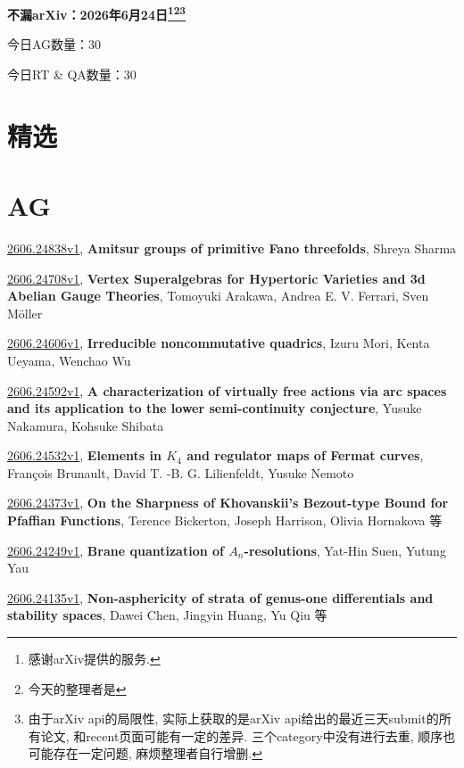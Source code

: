 \documentclass[9pt, a4paper]{article}
\theoremstyle{plain}
\theoremstyle{definition}
\theoremstyle{remark}
\newcommand{\arxiv}[3]{\href{https://arxiv.org/abs/#1}{#1}, \textbf{\textcolor{arxivblue}{#2}}, #3}
\newcommand{\AGnumber}{30}
\newcommand{\RTQAnumber}{30}
\newcommand{\NewestDate}{2026年6月24日}
\newcommand{\todayarXiver}{} %
\begin{document}
\begin{center}
    \Huge\textbf{不漏arXiv：\NewestDate\footnote{感谢arXiv提供的服务.}\footnote{今天的整理者是\todayarXiver}\footnote{由于arXiv api的局限性, 实际上获取的是arXiv api给出的最近三天submit的所有论文, 和recent页面可能有一定的差异. 三个category中没有进行去重, 顺序也可能存在一定问题, 麻烦整理者自行增删.}} \\
\end{center}

\setcounter{section}{-1}

\begin{center}
    今日AG数量：\AGnumber
    
    今日RT \& QA数量：\RTQAnumber
    
\end{center}


\section{精选}


\section{AG}
\arxiv{2606.24838v1}{Amitsur groups of primitive Fano threefolds}{Shreya Sharma}

\arxiv{2606.24708v1}{Vertex Superalgebras for Hypertoric Varieties and 3d Abelian Gauge Theories}{Tomoyuki Arakawa, Andrea E. V. Ferrari, Sven Möller}

\arxiv{2606.24606v1}{Irreducible noncommutative quadrics}{Izuru Mori, Kenta Ueyama, Wenchao Wu}

\arxiv{2606.24592v1}{A characterization of virtually free actions via arc spaces and its application to the lower semi-continuity conjecture}{Yusuke Nakamura, Kohsuke Shibata}

\arxiv{2606.24532v1}{Elements in $K_4$ and regulator maps of Fermat curves}{François Brunault, David T. -B. G. Lilienfeldt, Yusuke Nemoto}

\arxiv{2606.24373v1}{On the Sharpness of Khovanskii's Bezout-type Bound for Pfaffian Functions}{Terence Bickerton, Joseph Harrison, Olivia Hornakova 等}

\arxiv{2606.24249v1}{Brane quantization of $A_n$-resolutions}{Yat-Hin Suen, Yutung Yau}

\arxiv{2606.24135v1}{Non-asphericity of strata of genus-one differentials and stability spaces}{Dawei Chen, Jingyin Huang, Yu Qiu 等}
\end{document}
